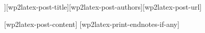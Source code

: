 \chaptitlepage[[wp2latex-post-subtitle]]{[wp2latex-post-title]}{[wp2latex-post-authors]}{[wp2latex-post-url]}

[wp2latex-post-content]
[wp2latex-print-endnotes-if-any]